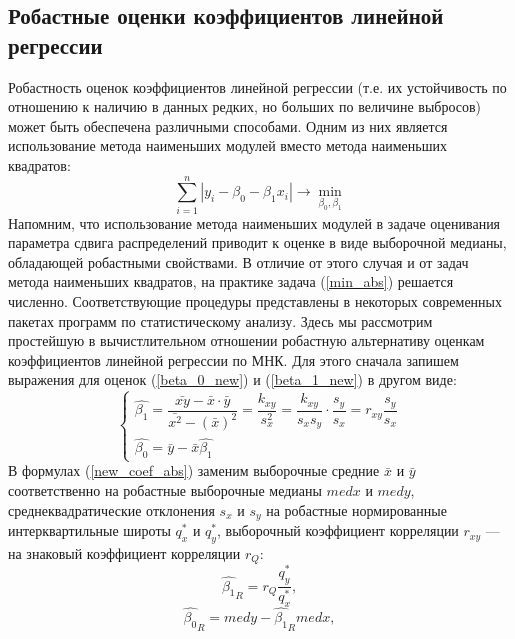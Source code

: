 \subsection{Робастные оценки коэффициентов линейной регрессии}
\noindent Робастность оценок коэффициентов линейной регрессии (т.е. их устойчивость по отношению к наличию в данных редких, но больших по величине выбросов) может быть обеспечена различными способами. Одним из них является использование метода наименьших модулей вместо метода наименьших квадратов:
\begin{equation}
	\sum_{i=1}^{n}{|y_{i} - \beta_{0} - \beta_{1}x_{i}|}\rightarrow \min_{\beta_{0}, \beta_{1}}
	\label{min_abs}
\end{equation}
Напомним, что использование метода наименьших модулей в задаче оценивания параметра сдвига распределений приводит к оценке в виде выборочной медианы, обладающей робастными свойствами. В отличие от этого случая и от задач метода наименьших квадратов, на практике задача (\ref{min_abs}) решается численно. Соответствующие процедуры представлены в некоторых современных пакетах программ по статистическому анализу.
\newline
Здесь мы рассмотрим простейшую в вычистлительном отношении робастную альтернативу оценкам коэффициентов линейной регрессии по МНК. Для этого сначала запишем выражения для оценок (\ref{beta_0_new}) и (\ref{beta_1_new}) в другом виде:
\begin{equation}
	\begin{cases}
		\hat{\beta_{1}} = \dfrac{\bar{xy} - \bar{x} \cdot \bar{y}}{\bar{x^{2}} - (\bar{x})^{2}} = \dfrac{k_{xy}}{s_{x}^{2}} = \dfrac{k_{xy}}{s_{x}s_{y}} \cdot \dfrac{s_{y}}{s_{x}} = r_{xy}\dfrac{s_{y}}{s_{x}} \\         
		\hat{\beta_{0}} = \bar{y} - \bar{x}\hat{\beta_{1}}
	\end{cases}
	\label{new_coef_abs}
\end{equation}
В формулах (\ref{new_coef_abs}) заменим выборочные средние $\bar{x}$ и $\bar{y}$ соответственно на робастные выборочные медианы $med x$ и $med y$, среднеквадратические отклонения $s_{x}$ и $s_{y}$ на робастные нормированные интерквартильные широты $q^{*}_{x}$ и $q^{*}_{y}$, выборочный коэффициент корреляции $r_{xy}$ — на знаковый коэффициент корреляции $r_{Q}$: 
\begin{equation}
	\hat{\beta_{1}}_{R} = r_{Q}\frac{q^{*}_{y}}{q^{*}_{x}},
	\label{b_1R}
\end{equation}
\begin{equation}
	\hat{\beta_{0}}_{R} = med y - \hat{\beta_{1}}_{R} med x,
	\label{b_0R}
\end{equation}
